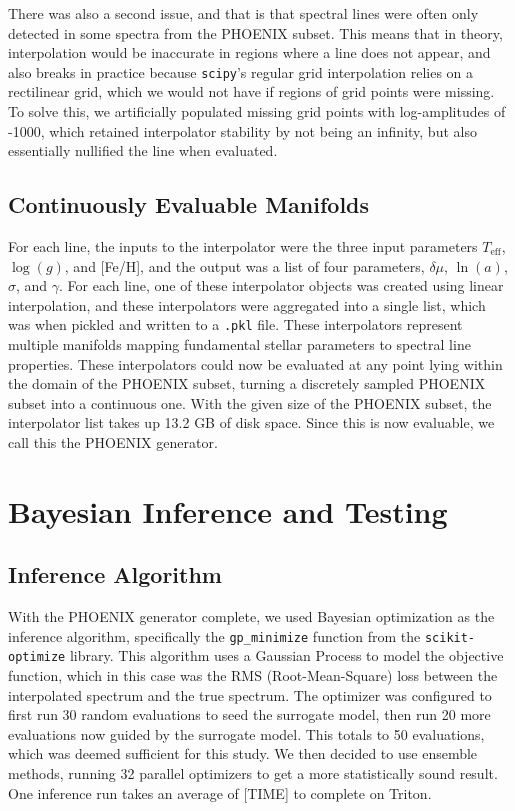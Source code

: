 \documentclass[twocolumn]{aastex631}
\begin{document}
There was also a second issue, and that is that spectral lines were often
only detected in some spectra from the PHOENIX subset. This means that in 
theory, interpolation would be inaccurate in regions where a line does not 
appear, and also breaks in practice because \texttt{scipy}'s regular grid
interpolation relies on a rectilinear grid, which we would not have if
regions of grid points were missing. To solve this, we artificially
populated missing grid points with log-amplitudes of -1000, which retained
interpolator stability by not being an infinity, but also essentially 
nullified the line when evaluated.

\subsection{Continuously Evaluable Manifolds}
For each line, the inputs to the interpolator were the three input parameters $T_{\mathrm{eff}}$,
$\log(g)$, and [Fe/H], and the output was a list of four parameters, 
$\delta\mu$, $\ln(a)$, $\sigma$, and $\gamma$. For each line, one of these 
interpolator objects was created using linear interpolation, and these 
interpolators were aggregated into a single list, which was when pickled 
and written to a \texttt{.pkl} file. These interpolators represent multiple 
manifolds mapping fundamental stellar parameters to spectral line properties. 
These interpolators could now be evaluated at any point lying within the 
domain of the PHOENIX subset, turning a discretely sampled PHOENIX subset 
into a continuous one. With the given size of the PHOENIX subset, the 
interpolator list takes up 13.2 GB of disk space. Since this is now evaluable,
we call this the PHOENIX generator.

\section{Bayesian Inference and Testing}
\subsection{Inference Algorithm}
With the PHOENIX generator complete, we used Bayesian optimization as the
inference algorithm, specifically the \texttt{gp\_minimize} function from
the \texttt{scikit-optimize} library. This algorithm uses a Gaussian Process
to model the objective function, which in this case was the RMS 
(Root-Mean-Square) loss between the interpolated spectrum and the true 
spectrum. The optimizer was configured to first run 30 random evaluations to 
seed the surrogate model, then run 20 more evaluations now guided by the 
surrogate model. This totals to 50 evaluations, which was deemed sufficient 
for this study. We then decided to use ensemble methods, running 32 parallel
optimizers to get a more statistically sound result. One inference run 
takes an average of [TIME] to complete on Triton.
\end{document}
